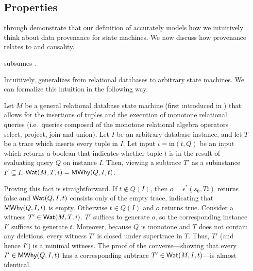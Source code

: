 \subsection{\WatProvenance{} Properties}
 through  demonstrate
that our definition of \watprovenance{} accurately models how we intuitively
think about data provenance for state machines. We now discuss how
\watprovenance{} provenance relates to \whyprovenance{} and causality.

%

\begin{claim}
  \Watprovenance{} subsumes \whyprovenance{}.
\end{claim}

\newcommand{\Min}{\text{in}}
Intuitively, \watprovenance{} generalizes \whyprovenance{} from relational
databases to arbitrary state machines. We can formalize this intuition in the
following way.

Let $M$ be a general relational database state machine (first introduced in
) that allows for the insertions of tuples and
the execution of monotone relational queries (i.e.\ queries composed of the
monotone relational algebra operators select, project, join and union). Let
$I$ be an arbitrary database instance, and let $T$ be a trace which inserts
every tuple in $I$. Let input $i = \Min(t, Q)$ be an input which returns a
boolean that indicates whether tuple $t$ is in the result of evaluating query
$Q$ on instance $I$. Then, viewing a subtrace $T'$ as a subinstance $I'
\subseteq I$, $\textsf{Wat}(M, T, i) = \textsf{MWhy}(Q, I, t)$.

Proving this fact is straightforward.
%
If $t \notin Q(I)$, then $o = \epsilon^*(s_0, Ti)$ returns false and $\textsf{Wat}(Q,
I, t)$ consists only of the empty trace, indicating that $\textsf{MWhy}(Q, I, t)$ is
empty.
%
Otherwise $t \in Q(I)$ and $o$ returns true. Consider a witness $T' \in \textsf{Wat}(M,
T, i)$. $T'$ suffices to generate $o$, so the corresponding instance $I'$
suffices to generate $t$. Moreover, because $Q$ is monotone and $T$ does not
contain any deletions, every witness $T'$ is closed under supertrace in $T$.
Thus, $T'$ (and hence $I'$) is a minimal witness. The proof of the
converse---showing that every $I' \in \textsf{MWhy}(Q, I, t)$ has a corresponding
subtrace $T' \in \textsf{Wat}(M, I, t)$---is almost identical.

